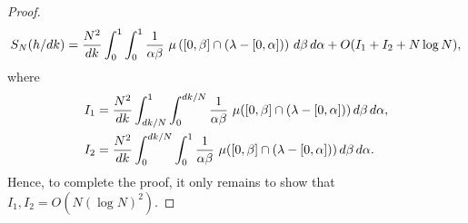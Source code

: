 \documentclass[10pt,a4paper]{amsart}
\def\d{{\,{\rm d}}}
\begin{document}
\begin{proof}
\begin{equation*}
    S_N(h/dk) = \frac{N^2}{dk} \int_{0}^1 \int_{0}^1 \frac{1}{\alpha \beta} \ \mu \left( \left[ 0, \beta \right] \cap \left(\lambda - \left[ 0, \alpha \right] \right) \right)  \d \beta \d \alpha +O(I_1+I_2+N\log N),
\end{equation*}
where
\begin{align*}
   I_1 &= \frac{N^2}{dk}\int_{dk/N}^1\int_0^{dk/N} \frac{1}{\alpha \beta} \ \mu( [0, \beta] \cap (\lambda - [0, \alpha] ) )\d \beta \d\alpha,\\
   I_2 &= \frac{N^2}{dk} \int_0^{dk/N} \int_{0}^1 \frac{1}{\alpha \beta} \ \mu( [0, \beta] \cap (\lambda - [0, \alpha] ) )\d \beta \d\alpha.
\end{align*}
Hence, to complete the proof, it only remains to show that $I_1, I_2=O(N(\log N)^2)$.


\end{proof}
\end{document}
